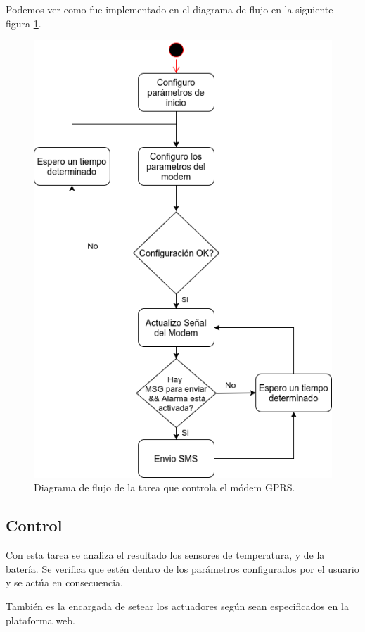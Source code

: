 Podemos ver como fue implementado en el diagrama de flujo en la siguiente figura \ref{fig:modem_task}.

\begin{figure}[!hp]
  \centering
  \includegraphics[scale=.5]{./Figures/modem_task.png}
  \caption{Diagrama de flujo de la tarea que controla el módem GPRS.}
  \label{fig:modem_task}
\end{figure}


\subsection*{Control}
Con esta tarea se analiza el resultado los sensores de temperatura, y de la batería. Se verifica que estén dentro de los parámetros configurados por el usuario y se actúa en consecuencia.

También es la encargada de setear los actuadores según sean especificados en la plataforma web.

